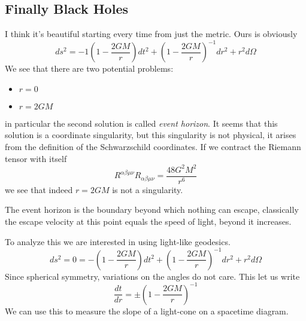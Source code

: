 \subsection{Finally Black Holes}

I think it's beautiful starting every time from just the metric. Ours is obviously
\[
ds^{2} = - 1 \left( 1- \frac{2GM}{r} \right)dt^{2} + \left( 1- \frac{2GM}{r} \right)^{-1} dr^{2} + r^{2}d\Omega 
\]
We see that there are two potential problems:
\begin{itemize}
\item $r = 0$
\item $r = 2GM$
\end{itemize}
in particular the second solution is called \emph{event horizon}. It seems that this solution is a coordinate singularity, but this singularity is not physical, it arises from the definition of the Schwarzschild coordinates.
If we contract the Riemann tensor with itself
\[
R^{\alpha \beta \mu \nu }R_{\alpha \beta \mu \nu } = \frac{48G^{2}M^{2}}{r^{6}}
\]
we see that indeed $r= 2GM$ is not a singularity.\par

The event horizon is the boundary beyond which nothing can escape, classically the escape velocity at this point equals the speed of light, beyond it increases.\par
To analyze this we are interested in using light-like geodesics.
\begin{equation}
ds^{2} = 0 = -\left( 1- \frac{2GM}{r} \right)dt^{2} + \left( 1 - \frac{2GM}{r} \right)^{-1}dr^{2} + r^{2}d\Omega 
\end{equation}
Since spherical symmetry, variations on the angles do not care. This let us write
\begin{equation}
\frac{d t}{d r} = \pm \left( 1- \frac{2GM}{r} \right)^{-1}
\end{equation}
We can use this to measure the slope of a light-cone on a spacetime diagram.\par
\bigskip
       

